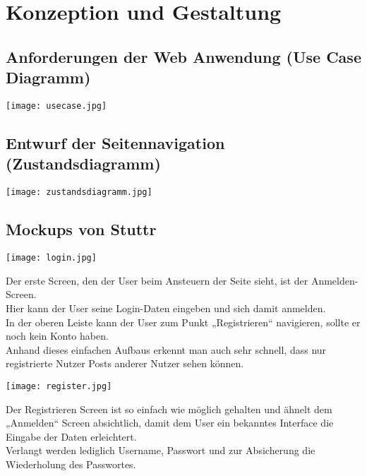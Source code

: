 \chapter{Konzeption und Gestaltung}

  \section{Anforderungen der Web Anwendung (Use Case Diagramm)}
    \begin{center}
      \texttt{[image: usecase.jpg]}
    \end{center}

\newpage
  \section{Entwurf der Seitennavigation (Zustandsdiagramm)}
    \begin{center}
      \texttt{[image: zustandsdiagramm.jpg]}
    \end{center}

\newpage
  \section{Mockups von Stuttr}
    \begin{center}
      \texttt{[image: login.jpg]}
    \end{center}

    Der erste Screen, den der User beim Ansteuern der Seite sieht, ist der Anmelden-Screen. \\
    Hier kann der User seine Login-Daten eingeben und sich damit anmelden. \\
    In der oberen Leiste kann der User zum Punkt „Registrieren“ navigieren, sollte er noch kein Konto haben. \\
    Anhand dieses einfachen Aufbaus erkennt man auch sehr schnell, dass nur registrierte Nutzer Posts anderer Nutzer sehen können.

    \begin{center}
      \texttt{[image: register.jpg]}
    \end{center}

    Der Registrieren Screen ist so einfach wie möglich gehalten und ähnelt dem „Anmelden“ Screen absichtlich, damit dem User ein bekanntes Interface die Eingabe der Daten erleichtert. \\
    Verlangt werden lediglich Username, Passwort und zur Absicherung die Wiederholung des Passwortes.

